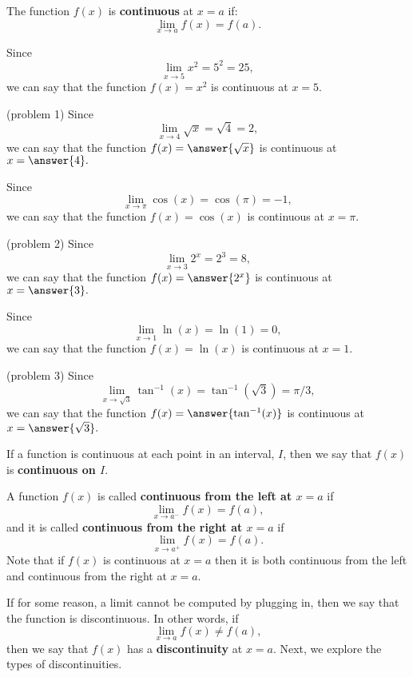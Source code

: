 \documentclass[handout]{ximera}
\begin{document}
\begin{definition}[Continuity]
The function $f(x)$ is \textbf{continuous} at $x = a$ if:
\[\lim_{x \to a} f(x) = f(a).\]
\end{definition}

\begin{example}[example 1]
Since
\[\lim_{x \to 5} x^2 = 5^2 = 25,\]
we can say that the function $f(x) = x^2$ is continuous at $x = 5$.
\end{example}

\begin{problem}(problem 1)
Since
\[\lim_{x \to 4} \sqrt{x} = \sqrt{4} = 2,\]
we can say that the function
$f(x) = \answer{\sqrt x}$
is continuous at
$x = \answer{4}.$
\end{problem}


\begin{example}[example 2]
Since
\[\lim_{x \to \pi} \cos(x) = \cos(\pi) = -1,\]
we can say that the function $f(x) = \cos(x)$ is continuous at $x = \pi$.
\end{example}

\begin{problem}(problem 2)
Since
\[\lim_{x \to 3} 2^x = 2^3 = 8,\]
we can say that the function
$f(x) = \answer{2^x}$
is continuous at
$x = \answer{3}.$
\end{problem}

\begin{example}[example 3]
Since
\[\lim_{x \to 1} \ln(x) = \ln(1) = 0,\]
we can say that the function $f(x) = \ln(x)$ is continuous at $x = 1$.
\end{example}

\begin{problem}(problem 3)
Since
\[\lim_{x \to \sqrt 3} \tan^{-1}(x) = \tan^{-1}(\sqrt 3) = \pi/3,\]
we can say that the function
$f(x) = \answer{\tan^{-1}(x)}$
is continuous at
$x = \answer{\sqrt 3}.$
\end{problem}

If a function is continuous at each point in an interval, $I$, then we say that $f(x)$ is \textbf{continuous on $I$}.

A function $f(x)$ is called \textbf{continuous from the left at $x=a$} if 
\[\lim_{x \to a^-} f(x) = f(a),\]
and it is called \textbf{continuous from the right at $x = a$} if
\[\lim_{x \to a^+} f(x) = f(a).\]
Note that if $f(x)$ is continuous at $x=a$ then it is both continuous from the left and 
continuous from the right at $x = a$.

If for some reason, a limit cannot be computed by plugging in, then we say that the function is discontinuous.
In other words, if
\[\lim_{x \to a} f(x) \neq f(a),\]
then we say that $f(x)$ has a \textbf{discontinuity} at $x = a$.
Next, we explore the types of discontinuities.
\end{document}
